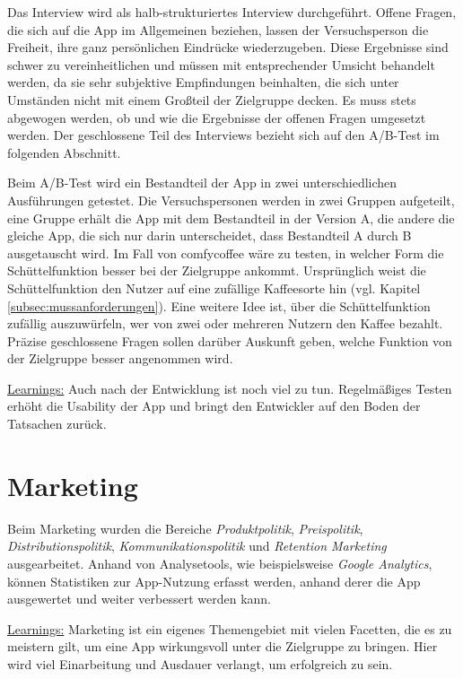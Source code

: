 Das Interview wird als halb-strukturiertes Interview durchgeführt. Offene Fragen, die sich auf die App im Allgemeinen beziehen, lassen der Versuchsperson die Freiheit, ihre ganz persönlichen Eindrücke wiederzugeben. Diese Ergebnisse sind schwer zu vereinheitlichen und müssen mit entsprechender Umsicht behandelt werden, da sie sehr subjektive Empfindungen beinhalten, die sich unter Umständen nicht mit einem Großteil der Zielgruppe decken. Es muss stets abgewogen werden, ob und wie die Ergebnisse der offenen Fragen umgesetzt werden. Der geschlossene Teil des Interviews bezieht sich auf den A/B-Test im folgenden Abschnitt.

Beim A/B-Test wird ein Bestandteil der App in zwei unterschiedlichen Ausführungen getestet. Die Versuchspersonen werden in zwei Gruppen aufgeteilt, eine Gruppe erhält die App mit dem Bestandteil in der Version A, die andere die gleiche App, die sich nur darin unterscheidet, dass Bestandteil A durch B ausgetauscht wird. Im Fall von comfycoffee wäre zu testen, in welcher Form die Schüttelfunktion besser bei der Zielgruppe ankommt. Ursprünglich weist die Schüttelfunktion den Nutzer auf eine zufällige Kaffeesorte hin (vgl. Kapitel \ref{subsec:mussanforderungen}). Eine weitere Idee ist, über die Schüttelfunktion zufällig auszuwürfeln, wer von zwei oder mehreren Nutzern den Kaffee bezahlt. Präzise geschlossene Fragen sollen darüber Auskunft geben, welche Funktion von der Zielgruppe besser angenommen wird.

\underline{Learnings:}
Auch nach der Entwicklung ist noch viel zu tun. Regelmäßiges Testen erhöht die Usability der App und bringt den Entwickler auf den Boden der Tatsachen zurück.

\section{Marketing}
\label{sec:marketing}
Beim Marketing wurden die Bereiche \emph{Produktpolitik}, \emph{Preispolitik}, \emph{Distributionspolitik}, \emph{Kommunikationspolitik} und \emph{Retention Marketing} ausgearbeitet. Anhand von Analysetools, wie beispielsweise \emph{Google Analytics}, können Statistiken zur App-Nutzung erfasst werden, anhand derer die App ausgewertet und weiter verbessert werden kann.

\underline{Learnings:}
Marketing ist ein eigenes Themengebiet mit vielen Facetten, die es zu meistern gilt, um eine App wirkungsvoll unter die Zielgruppe zu bringen. Hier wird viel Einarbeitung und Ausdauer verlangt, um erfolgreich zu sein.

